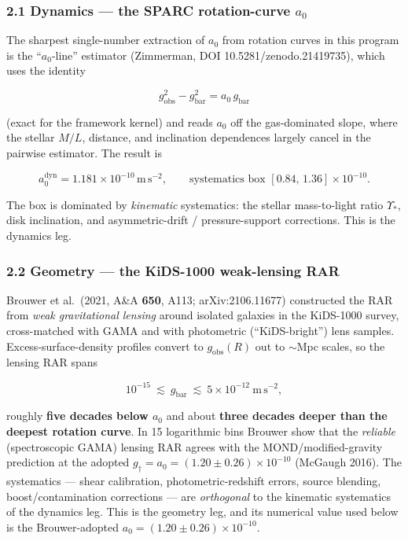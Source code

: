 \documentclass[
]{article}
\begin{document}
\subsubsection{\texorpdfstring{2.1 Dynamics --- the SPARC rotation-curve
\(a_0\)}{2.1 Dynamics --- the SPARC rotation-curve a\_0}}\label{dynamics-the-sparc-rotation-curve-a_0}

The sharpest single-number extraction of \(a_0\) from rotation curves in
this program is the ``\(a_0\)-line'' estimator (Zimmerman, DOI
10.5281/zenodo.21419735), which uses the identity

\[
g_\mathrm{obs}^2 - g_\mathrm{bar}^2 = a_0\,g_\mathrm{bar}
\]

(exact for the framework kernel) and reads \(a_0\) off the gas-dominated
slope, where the stellar \(M/L\), distance, and inclination dependences
largely cancel in the pairwise estimator. The result is

\[
a_0^\mathrm{dyn} = 1.181\times10^{-10}\,\mathrm{m\,s^{-2}}, \qquad \text{systematics box } [0.84,\,1.36]\times10^{-10}.
\]

The box is dominated by \emph{kinematic} systematics: the stellar
mass-to-light ratio \(\Upsilon_*\), disk inclination, and
asymmetric-drift / pressure-support corrections. This is the dynamics
leg.

\subsubsection{2.2 Geometry --- the KiDS-1000 weak-lensing
RAR}\label{geometry-the-kids-1000-weak-lensing-rar}

Brouwer et al.~(2021, A\&A \textbf{650}, A113; arXiv:2106.11677)
constructed the RAR from \emph{weak gravitational lensing} around
isolated galaxies in the KiDS-1000 survey, cross-matched with GAMA and
with photometric (``KiDS-bright'') lens samples. Excess-surface-density
profiles convert to \(g_\mathrm{obs}(R)\) out to \(\sim\)Mpc scales, so the
lensing RAR spans

\[
10^{-15}\ \lesssim\ g_\mathrm{bar}\ \lesssim\ 5\times10^{-12}\ \mathrm{m\,s^{-2}},
\]

roughly \textbf{five decades below \(a_0\)} and about \textbf{three
decades deeper than the deepest rotation curve}. In 15 logarithmic bins
Brouwer show that the \emph{reliable} (spectroscopic GAMA) lensing RAR
agrees with the MOND/modified-gravity prediction at the adopted
\(g_\dagger = a_0 = (1.20\pm0.26)\times10^{-10}\) (McGaugh 2016). The
systematics --- shear calibration, photometric-redshift errors, source
blending, boost/contamination corrections --- are \emph{orthogonal} to
the kinematic systematics of the dynamics leg. This is the geometry leg,
and its numerical value used below is the Brouwer-adopted
\(a_0=(1.20\pm0.26)\times10^{-10}\).
\end{document}
